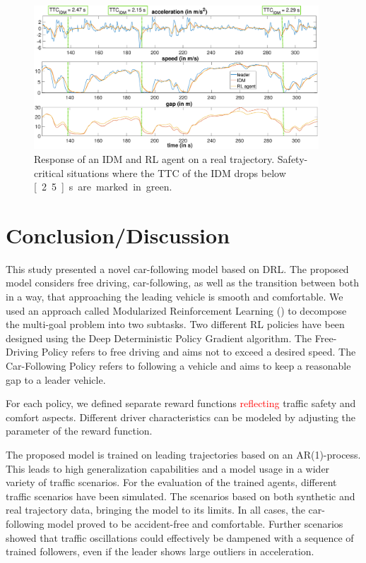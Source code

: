 \documentclass[review]{elsarticle}
\providecommand{\red}[1]{\textcolor{red}{#1}}
\providecommand{\martin}[1]{\red{#1}} %
\providecommand{\3}{{\ss}}
\begin{document}
\begin{figure}	
	\centering
	\includegraphics[width=0.95\textwidth]{images/TTC_CaseStudy}
	\caption{Response of an IDM and RL agent on a real trajectory. Safety-critical situations where the TTC of the IDM drops below \unit[2.5]{s} are marked in green.}
	\label{fig:TTC_CaseStudy}
\end{figure}

\section{Conclusion/Discussion}
\label{sec:conclusion}
This study presented a novel car-following model based on DRL. The proposed model considers free driving, car-following, as well as the transition between both in a way, that approaching the leading vehicle is smooth and comfortable. We used an approach called Modularized Reinforcement Learning (\cite{MRL}) to decompose the multi-goal problem into two subtasks. Two different RL policies have been designed using the Deep Deterministic Policy Gradient algorithm. The Free-Driving Policy refers to free driving and aims not to exceed a desired speed. The Car-Following Policy refers to following a vehicle and aims to keep a reasonable gap to a leader vehicle.

For each policy, we defined separate reward functions \martin{reflecting} traffic safety and comfort aspects. 
Different driver characteristics can be modeled by adjusting the parameter of the reward function.

The proposed model is trained on leading trajectories based on an AR(1)-process. This leads to high generalization capabilities and a model usage in a wider variety of traffic scenarios. 
For the evaluation of the trained agents, different traffic scenarios
have been simulated. The scenarios based on both synthetic and
real trajectory data, bringing the model to its limits. 
In all cases, the car-following model proved to be accident-free and comfortable. Further scenarios showed that traffic oscillations could effectively be dampened with a sequence of trained followers, even if the leader shows large outliers in acceleration.





\end{document}
